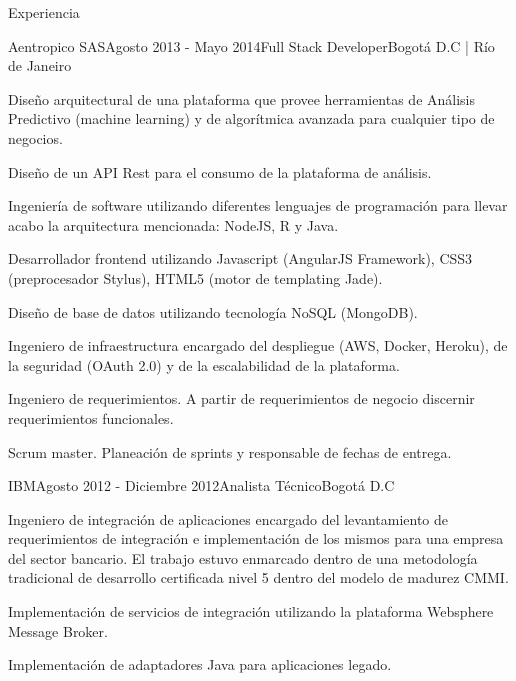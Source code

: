 \documentclass[spanish]{resume} %
\begin{document}
\begin{rSection}{Experiencia}

\begin{rSubsection}{Aentropico SAS}{Agosto 2013 - Mayo 2014}{Full Stack Developer}{Bogot\'a D.C | R\'io de Janeiro}
\item Dise\~no arquitectural de una plataforma que provee herramientas de An\'alisis Predictivo (machine learning) y de algor\'itmica avanzada para cualquier tipo de negocios.
\item Dise\~no de un API Rest para el consumo de la plataforma de an\'alisis.
\item Ingenier\'ia de software utilizando diferentes lenguajes de programaci\'on para llevar acabo la arquitectura mencionada: NodeJS, R y Java.
\item Desarrollador frontend utilizando Javascript (AngularJS Framework), CSS3 (preprocesador Stylus), HTML5 (motor de templating Jade).
\item Dise\~no de base de datos utilizando tecnolog\'ia NoSQL (MongoDB).
\item Ingeniero de infraestructura encargado del despliegue (AWS, Docker, Heroku), de la seguridad (OAuth 2.0) y de la escalabilidad de la plataforma.
\item Ingeniero de requerimientos. A partir de requerimientos de negocio discernir requerimientos funcionales.
\item Scrum master. Planeaci\'on de sprints y responsable de fechas de entrega.
\end{rSubsection}


\begin{rSubsection}{IBM}{Agosto 2012 - Diciembre 2012}{Analista T\'ecnico}{Bogot\'a D.C}
\item Ingeniero de integraci\'on de aplicaciones encargado del levantamiento de requerimientos de integraci\'on e implementaci\'on de los mismos para una empresa del sector bancario. El trabajo estuvo enmarcado dentro de una metodolog\'ia tradicional de desarrollo certificada nivel 5 dentro del modelo de madurez CMMI.
\item Implementaci\'on de servicios de integraci\'on utilizando la plataforma Websphere Message Broker.
\item Implementaci\'on de adaptadores Java para aplicaciones legado.
\end{rSubsection}



\end{rSection}
\end{document}
